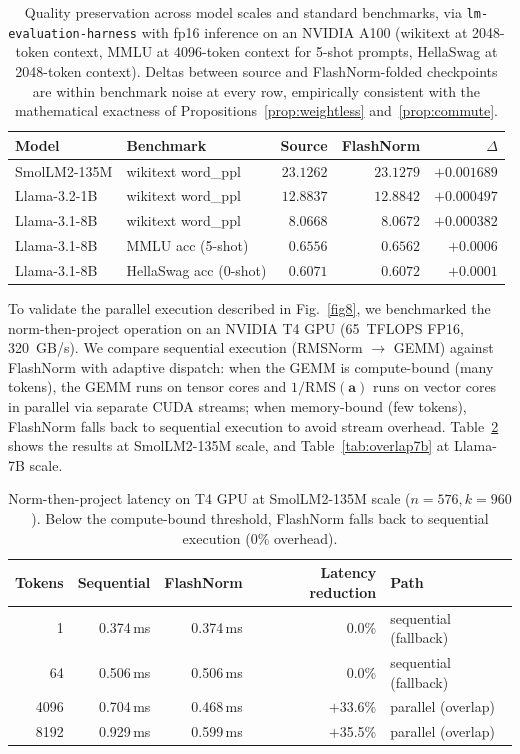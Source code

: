 \documentclass{article}
\begin{document}
\begin{table}[h!] \centering
\caption{Quality preservation across model scales and standard benchmarks, via \texttt{lm-evaluation-harness} with fp16 inference on an NVIDIA A100 (wikitext at 2048-token context, MMLU at 4096-token context for 5-shot prompts, HellaSwag at 2048-token context). Deltas between source and FlashNorm-folded checkpoints are within benchmark noise at every row, empirically consistent with the mathematical exactness of Propositions~\ref{prop:weightless} and~\ref{prop:commute}.}
\label{tab:quality}
\begin{tabular}{l l r r r}
\hline
Model & Benchmark & Source & FlashNorm & $\Delta$ \\
\hline
SmolLM2-135M & wikitext word\_ppl          & $23.1262$ & $23.1279$ & $+0.001689$ \\
Llama-3.2-1B & wikitext word\_ppl          & $12.8837$ & $12.8842$ & $+0.000497$ \\
Llama-3.1-8B & wikitext word\_ppl          & $8.0668$  & $8.0672$  & $+0.000382$ \\
Llama-3.1-8B & MMLU acc (5-shot)           & $0.6556$  & $0.6562$  & $+0.0006$ \\
Llama-3.1-8B & HellaSwag acc (0-shot)      & $0.6071$  & $0.6072$  & $+0.0001$ \\
\hline
\end{tabular}
\end{table}

To validate the parallel execution described in Fig.~\ref{fig8}, we benchmarked the norm-then-project operation on an NVIDIA T4 GPU (65~TFLOPS FP16, 320~GB/s). We compare sequential execution (RMSNorm $\rightarrow$ GEMM) against FlashNorm with adaptive dispatch: when the GEMM is compute-bound (many tokens), the GEMM runs on tensor cores and $1/\mathrm{RMS}(\mathbf{a})$ runs on vector cores in parallel via separate CUDA streams; when memory-bound (few tokens), FlashNorm falls back to sequential execution to avoid stream overhead. Table~\ref{tab:overlap} shows the results at SmolLM2-135M scale, and Table~\ref{tab:overlap7b} at Llama-7B scale.

\begin{table}[h!] \centering
\caption{Norm-then-project latency on T4 GPU at SmolLM2-135M scale ($n{=}576, k{=}960$). Below the compute-bound threshold, FlashNorm falls back to sequential execution (0\% overhead).}
\label{tab:overlap}
\begin{tabular}{r r r r l}
\hline
Tokens & Sequential & FlashNorm & Latency reduction & Path \\
\hline
1      & 0.374\,ms & 0.374\,ms & $0.0$\% & sequential (fallback) \\
64     & 0.506\,ms & 0.506\,ms & $0.0$\% & sequential (fallback) \\
4096   & 0.704\,ms & 0.468\,ms & $+$33.6\% & parallel (overlap) \\
8192   & 0.929\,ms & 0.599\,ms & $+$35.5\% & parallel (overlap) \\
\hline
\end{tabular}
\end{table}
\end{document}
